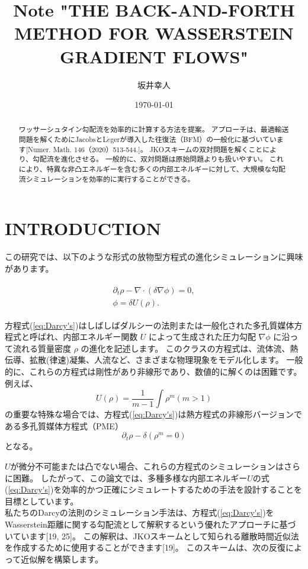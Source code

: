\documentclass{jsarticle}
\title{Note  "THE BACK-AND-FORTH METHOD FOR WASSERSTEIN GRADIENT FLOWS"}
\author{坂井幸人}
\date{\today}
\theoremstyle{definition}
\begin{document}
\maketitle

\begin{abstract}
    ワッサーシュタイン勾配流を効率的に計算する方法を提案。
    アプローチは、最適輸送問題を解くためにJacobsとL$\acute{e}$gerが導入した往復法（BFM）の一般化に基づいています[Numer. Math. 146（2020）513-544.]。
    JKOスキームの双対問題を解くことにより、勾配流を進化させる。
    一般的に、双対問題は原始問題よりも扱いやすい。
    これにより、特異な非凸エネルギーを含む多くの内部エネルギーに対して、大規模な勾配流シミュレーションを効率的に実行することができる。
\end{abstract}

\section{INTRODUCTION}

この研究では、以下のような形式の放物型方程式の進化シミュレーションに興味があります。

\begin{align}
    \begin{split}
        \label{eq:Darcy's}
        \partial_t \rho - \nabla \cdot (\delta \nabla \phi) = 0, \\
        \phi = \delta U(\rho).
    \end{split}
\end{align}


方程式(\ref{eq:Darcy's})はしばしばダルシーの法則または一般化された多孔質媒体方程式と呼ばれ、内部エネルギー関数 $U$ によって生成された圧力勾配 $\nabla \phi$ に沿って流れる質量密度 $\rho$ の進化を記述します。
このクラスの方程式は、流体流、熱伝導、拡散(律速)凝集、人流など、さまざまな物理現象をモデル化します。
一般的に、{\color{red}これらの方程式は剛性があり非線形であり、数値的に解くのは困難です。}
例えば、
$$
    U(\rho) = \frac{1}{m - 1} \int \rho^m (m > 1)
$$
の重要な特殊な場合では、方程式(\ref{eq:Darcy's})は熱方程式の非線形バージョンである多孔質媒体方程式（PME） 
$$
    \partial_t \rho - \delta(\rho^m = 0)
$$
となる。


$U$が微分不可能または凸でない場合、これらの方程式のシミュレーションはさらに困難。
したがって、この論文では、多種多様な内部エネルギー$U$の式(\ref{eq:Darcy's})を効率的かつ正確にシミュレートするための手法を設計することを目標としています。\\

私たちのDarcyの法則のシミュレーション手法は、方程式(\ref{eq:Darcy's})をWasserstein距離に関する勾配流として解釈するという優れたアプローチに基づいています[19, 25]。
この解釈は、JKOスキームとして知られる離散時間近似法を作成するために使用することができます[19]。
このスキームは、次の反復によって近似解を構築します。
\end{document}
